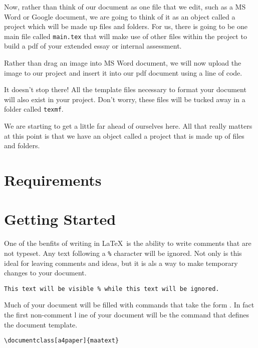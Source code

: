 Now, rather than think of our document as one file that we edit, such as a
MS Word or Google document, we are going to think of it as an object called a
project which will be made up files and folders. For us, there is going to be
one main file called \texttt{main.tex} that will make use of other files
within the project to build a pdf of your extended essay or internal assessment.

\begin{example}
  Rather than drag an image into MS Word document, we will now
  upload the image to our project and insert it into our pdf document using
  a line of code.
\end{example}

It doesn't stop there!  All the template files necessary to format your document
will also exist in your project.  Don't worry, these files will be tucked away
in a folder called \texttt{texmf}.

We are starting to get a little far ahead of ourselves here.  All that really
matters at this point is that we have an object called a project that is made up
of files and folders.


\section{Requirements}

\section{Getting Started}

One of the benfits of writing in \LaTeX\, is the ability to write comments
that are not typeset.  Any text following a \lstinline{%} character will be 
ignored.  Not only is this ideal for leaving comments and ideas, but it is 
als a way to make temporary changes to your document.
\lstset{style=mhotexcode}
\begin{lstlisting}[belowskip=-2 \baselineskip]
% This code will be ignored
This text will be visible % while this text will be ignored.
\end{lstlisting}
Much of your document will be filled with commands that take the form 
. In fact the first non-comment l
ine of your document will be the command that defines the document template.
\begin{lstlisting}
\documentclass[a4paper]{maatext}
\end{lstlisting}
